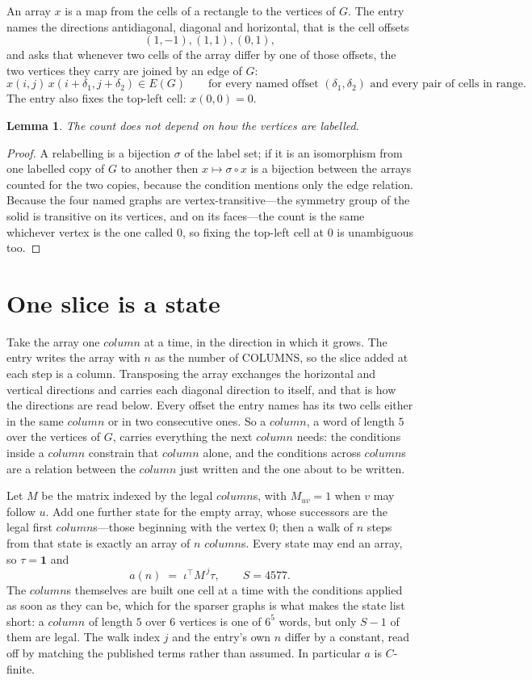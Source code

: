 \documentclass[11pt,a4paper]{article}
\theoremstyle{plain}
\newtheorem{lemma}[theorem]{Lemma}
\theoremstyle{definition}
\begin{document}
An array $x$ is a map from the cells of a rectangle to the vertices of $G$. The entry names the
directions antidiagonal, diagonal and horizontal, that is the cell offsets
\[
(1,-1), (1,1), (0,1),
\]
and asks that whenever two cells of the array differ by one of those offsets, the two vertices
they carry are joined by an edge of $G$:
\[
x(i,j)\,x(i+\delta_1,j+\delta_2)\in E(G)\qquad
\text{for every named offset } (\delta_1,\delta_2)\text{ and every pair of cells in range.}
\]
The entry also fixes the top-left cell: $x(0,0)=0$.

\begin{lemma}\label{lem:label}
The count does not depend on how the vertices are labelled.
\end{lemma}

\begin{proof}
A relabelling is a bijection $\sigma$ of the label set; if it is an isomorphism from one
labelled copy of $G$ to another then $x\mapsto\sigma\circ x$ is a bijection between the arrays
counted for the two copies, because the condition mentions only the edge relation.
Because the four named graphs are vertex-transitive---the symmetry group of the solid is transitive on its vertices, and on its faces---the count is the same whichever vertex is the one called $0$, so fixing the top-left cell at $0$ is unambiguous too.
\end{proof}

\section{One slice is a state}

Take the array one $column$ at a time, in the direction in which it grows. The entry writes the array with $n$ as the number of COLUMNS, so the slice added at each step is a column. Transposing the array exchanges the horizontal and vertical directions and carries each diagonal direction to itself, and that is how the directions are read below.
Every offset the entry names has its two cells either in the same $column$ or in two
consecutive ones. So a $column$, a word of length $5$ over the vertices of $G$, carries
everything the next $column$ needs: the conditions inside a $column$ constrain that
$column$ alone, and the conditions across $column$s are a relation between the
$column$ just written and the one about to be written.

Let $M$ be the matrix indexed by the legal $column$s, with $M_{uv}=1$ when $v$ may
follow $u$. Add one further state for the empty array, whose successors are the legal first
$column$s---those beginning with the vertex $0$; then a walk of
$n$ steps from that state is exactly an array of $n$ $column$s. Every state may end an
array, so $\tau=\mathbf{1}$ and
\[
a(n)\;=\;\iota^{\!\top}M^{\,j}\tau ,\qquad S=4577.
\]
The $column$s themselves are built one cell at a time with the conditions applied as soon
as they can be, which for the sparser graphs is what makes the state list short: a $column$
of length $5$ over $6$ vertices is one of $6^{5}$ words, but only $S-1$ of them are
legal. The walk index $j$ and the entry's own $n$ differ by a constant, read off by matching the
published terms rather than assumed. In particular $a$ is $C$-finite.
\end{document}
